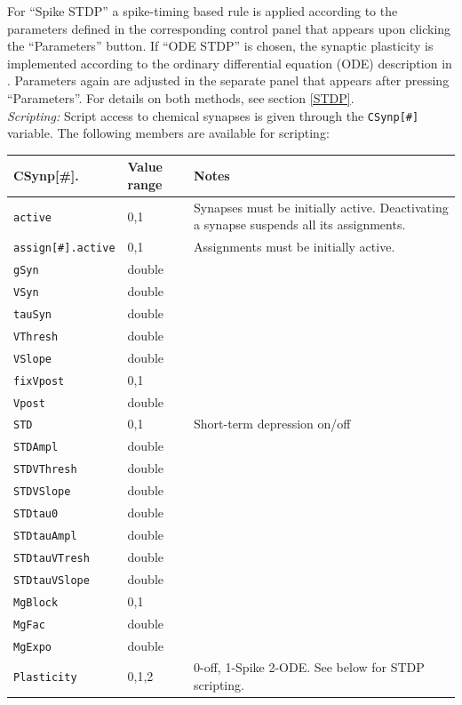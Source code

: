 \documentclass{article}
\begin{document}
%
For ``Spike STDP'' a spike-timing based
  rule is applied according to the parameters defined in the
  corresponding control panel that appears upon clicking the
  ``Parameters'' button.
  If ``ODE STDP'' is chosen, the synaptic
  plasticity is implemented according to the ordinary differential
  equation (ODE) description in \cite{Abarbanel2002}. Parameters again
  are adjusted in the separate panel that appears after pressing
  ``Parameters''. For details on both methods, see section \ref{STDP}.\\

\noindent
\emph{Scripting:} Script access to chemical synapses is given through the \texttt{CSynp[\#]} variable.
The following members are available for scripting: \\
\begin{tabularx}{\linewidth}{|ll|X|}
	\hline
	{\bf CSynp[\#].\textvisiblespace} & {\bf Value range} & {\bf Notes} \\
	\hline
	\texttt{active} & 0,1 & Synapses must be initially active. Deactivating a synapse suspends all
	its assignments. \\
	\texttt{assign[\#].active} & 0,1 & Assignments must be initially active. \\
	\texttt{gSyn} & double & \\
	\texttt{VSyn} & double & \\
	\texttt{tauSyn} & double & \\
	\texttt{VThresh} & double & \\
	\texttt{VSlope} & double & \\
	\texttt{fixVpost} & 0,1 & \\
	\texttt{Vpost} & double & \\
	\texttt{STD} & 0,1 & Short-term depression on/off \\
	\texttt{STDAmpl} & double & \\
	\texttt{STDVThresh} & double & \\
	\texttt{STDVSlope} & double & \\
	\texttt{STDtau0} & double & \\
	\texttt{STDtauAmpl} & double & \\
	\texttt{STDtauVTresh} & double & \\
	\texttt{STDtauVSlope} & double & \\
	\texttt{MgBlock} & 0,1 & \\
	\texttt{MgFac} & double & \\
	\texttt{MgExpo} & double & \\
	\texttt{Plasticity} & 0,1,2 & 0-off, 1-Spike 2-ODE. See below for STDP scripting.\\
	\hline
\end{tabularx}
\end{document}
